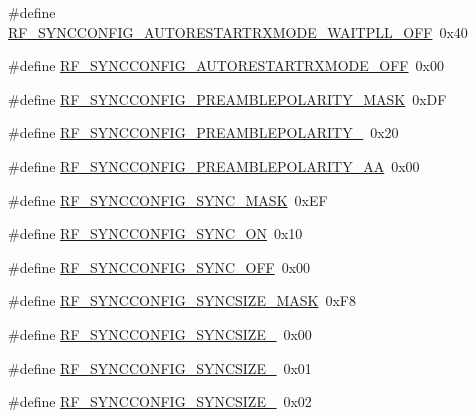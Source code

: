 \begin{DoxyCompactItemize}
\item 
\#define \hyperlink{sx1276Regs-Fsk_8h_a83c54f53204c35c3e78d90505218766b}{R\+F\+\_\+\+S\+Y\+N\+C\+C\+O\+N\+F\+I\+G\+\_\+\+A\+U\+T\+O\+R\+E\+S\+T\+A\+R\+T\+R\+X\+M\+O\+D\+E\+\_\+\+W\+A\+I\+T\+P\+L\+L\+\_\+\+O\+FF}~0x40
\item 
\#define \hyperlink{sx1276Regs-Fsk_8h_ac2c0f0cad363bba58dcdcc0bebbbbf56}{R\+F\+\_\+\+S\+Y\+N\+C\+C\+O\+N\+F\+I\+G\+\_\+\+A\+U\+T\+O\+R\+E\+S\+T\+A\+R\+T\+R\+X\+M\+O\+D\+E\+\_\+\+O\+FF}~0x00
\item 
\#define \hyperlink{sx1276Regs-Fsk_8h_aabfc2e96ddfb3844b90e9c9dc455dcaa}{R\+F\+\_\+\+S\+Y\+N\+C\+C\+O\+N\+F\+I\+G\+\_\+\+P\+R\+E\+A\+M\+B\+L\+E\+P\+O\+L\+A\+R\+I\+T\+Y\+\_\+\+M\+A\+SK}~0x\+DF
\item 
\#define \hyperlink{sx1276Regs-Fsk_8h_a9aa039b3727ca99daa81e3e9b6710a97}{R\+F\+\_\+\+S\+Y\+N\+C\+C\+O\+N\+F\+I\+G\+\_\+\+P\+R\+E\+A\+M\+B\+L\+E\+P\+O\+L\+A\+R\+I\+T\+Y\+\_}~0x20
\item 
\#define \hyperlink{sx1276Regs-Fsk_8h_a413dee0514df5bc1fa6a1aa64c08c55f}{R\+F\+\_\+\+S\+Y\+N\+C\+C\+O\+N\+F\+I\+G\+\_\+\+P\+R\+E\+A\+M\+B\+L\+E\+P\+O\+L\+A\+R\+I\+T\+Y\+\_\+\+AA}~0x00
\item 
\#define \hyperlink{sx1276Regs-Fsk_8h_adde21fff1779d6bb7165ccc5982e255a}{R\+F\+\_\+\+S\+Y\+N\+C\+C\+O\+N\+F\+I\+G\+\_\+\+S\+Y\+N\+C\+\_\+\+M\+A\+SK}~0x\+EF
\item 
\#define \hyperlink{sx1276Regs-Fsk_8h_a7ccce52a152f24047a49b53f9238ce57}{R\+F\+\_\+\+S\+Y\+N\+C\+C\+O\+N\+F\+I\+G\+\_\+\+S\+Y\+N\+C\+\_\+\+ON}~0x10
\item 
\#define \hyperlink{sx1276Regs-Fsk_8h_a09a78683bc189b8a3c47ec3aee9bd562}{R\+F\+\_\+\+S\+Y\+N\+C\+C\+O\+N\+F\+I\+G\+\_\+\+S\+Y\+N\+C\+\_\+\+O\+FF}~0x00
\item 
\#define \hyperlink{sx1276Regs-Fsk_8h_a470d9a45389bc8f22f4eee11937274fc}{R\+F\+\_\+\+S\+Y\+N\+C\+C\+O\+N\+F\+I\+G\+\_\+\+S\+Y\+N\+C\+S\+I\+Z\+E\+\_\+\+M\+A\+SK}~0x\+F8
\item 
\#define \hyperlink{sx1276Regs-Fsk_8h_ac7cf5fb2ab72c6b637f27980a77d49b3}{R\+F\+\_\+\+S\+Y\+N\+C\+C\+O\+N\+F\+I\+G\+\_\+\+S\+Y\+N\+C\+S\+I\+Z\+E\+\_}~0x00
\item 
\#define \hyperlink{sx1276Regs-Fsk_8h_ab3cee473593e065fb7bb4121dba8dfc8}{R\+F\+\_\+\+S\+Y\+N\+C\+C\+O\+N\+F\+I\+G\+\_\+\+S\+Y\+N\+C\+S\+I\+Z\+E\+\_}~0x01
\item 
\#define \hyperlink{sx1276Regs-Fsk_8h_a0b7febf6601e6e048eadfea72756fbf5}{R\+F\+\_\+\+S\+Y\+N\+C\+C\+O\+N\+F\+I\+G\+\_\+\+S\+Y\+N\+C\+S\+I\+Z\+E\+\_}~0x02

\end{DoxyCompactItemize}
